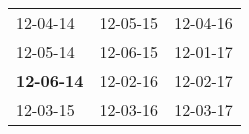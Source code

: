 \begin{supertabular}{p{0.33\columnwidth}p{0.33\columnwidth}p{0.33\columnwidth}}
          12-04-14\textsuperscript{} &  12-05-15\textsuperscript{} &  12-04-16\textsuperscript{} \\
          12-05-14\textsuperscript{} &  12-06-15\textsuperscript{} &  12-01-17\textsuperscript{} \\
 \textbf{12-06-14\textsuperscript{}} &  12-02-16\textsuperscript{} &  12-02-17\textsuperscript{} \\
          12-03-15\textsuperscript{} &  12-03-16\textsuperscript{} &  12-03-17\textsuperscript{} \\
\end{supertabular}

